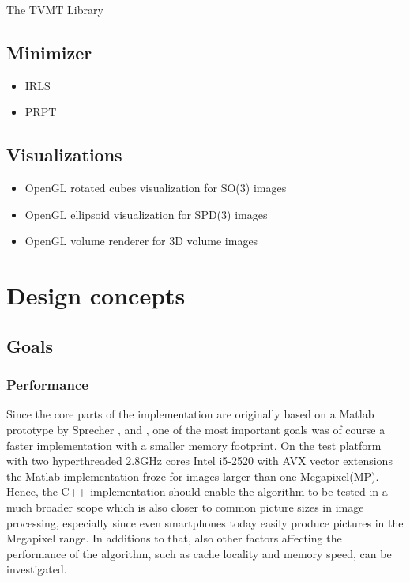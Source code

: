 \begin{chapter}{The TVMT Library}
\subsection{Minimizer} %
\label{sub:Minimizer}
\begin{itemize}
	\item IRLS
	\item PRPT
\end{itemize}

\subsection{Visualizations} %
\label{sub:Visualizations}
\begin{itemize}
    \item OpenGL rotated cubes visualization for SO(3) images
    \item OpenGL ellipsoid visualization for SPD(3) images
    \item OpenGL volume renderer for 3D volume images
\end{itemize}


\section{Design concepts} %
\label{sec:Design}

\subsection{Goals} %
\label{sub:Goals}

\subsubsection{Performance} %
\label{ssub:Performance}
Since the core parts of the implementation are originally based on a Matlab prototype by Sprecher \cite{SprecherIRLS}, \cite{manuel} and \cite{mara}, one of the most important
goals was of course a faster implementation with a smaller memory footprint. On the test platform with two hyperthreaded 2.8GHz cores Intel i5-2520 with AVX vector extensions
the Matlab implementation froze for images larger than one Megapixel(MP). Hence, the C++ implementation should enable the algorithm to be tested in a much broader scope which is
also closer to common picture sizes in image processing, especially since even smartphones today easily produce pictures in the Megapixel range.
In additions to that, also other factors affecting the performance of the algorithm, such as cache locality and memory speed, can be investigated.\\


\end{chapter}
